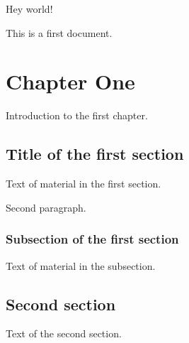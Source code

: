 \documentclass{book}
\begin{document}
	Hey world!
	
	This is a first document.
	
	\chapter{Chapter One}
	Introduction to the first chapter.
	
	\section{Title of the first section}
	
	Text of material in the first section.
	
	Second paragraph.
	
	\subsection{Subsection of the first section}
	
	Text of material in the subsection.
	
	
	\section{Second section}
	
	Text of the second section.
\end{document}
